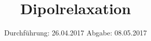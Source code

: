 

\subject{V 48}
\title{Dipolrelaxation}
\date{
  Durchführung: 26.04.2017
  \hspace{3em}
  Abgabe: 08.05.2017
}



\maketitle
\thispagestyle{empty}
\tableofcontents
\newpage






\printbibliography


